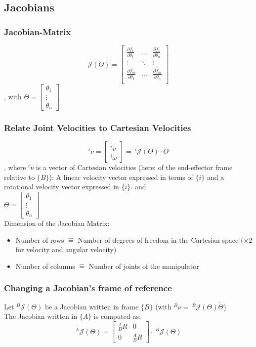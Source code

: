 \documentclass[10pt,a4paper]{article}
\newcommand{\vect}[1]{\ensuremath{\begin{bmatrix}#1\end{bmatrix}}}
\begin{document}
\subsection{Jacobians}
\subsubsection{Jacobian-Matrix}
$$
	\mathcal{J}(\Theta) = \begin{bmatrix}
		\frac{\partial f_1}{\partial \theta_1} & \dots & \frac{\partial f_1}{\partial \theta_n} \\
		\vdots & \ddots & \vdots \\
		\frac{\partial f_m}{\partial \theta_1} & \dots & \frac{\partial f_m}{\partial \theta_n} \\
	\end{bmatrix}
$$
, with $\Theta = \vect{\theta_1 \\ \vdots \\ \theta_n}$

\subsubsection{Relate Joint Velocities to Cartesian Velocities}
$$
	^i\nu = \vect{^iv \\ ^i\omega} = ~^i\mathcal{J}(\Theta) ⋅ \dot{\Theta}
$$
, where $^i\nu$ is a vector of Cartesian velocities (here: of the end-effector frame relative to $\{B\}$): A linear velocity vector expressed in terms of $\{i\}$ and a rotational velocity vector expressed in $\{i\}$. and \\
$\Theta = \vect{\theta_1 \\ \vdots \\ \theta_n}$ \\

Dimension of the Jacobian Matrix:
\begin{itemize}
	\item Number of rows $\hat{=}$ Number of degrees of freedom in the Cartesian space ($\times 2$ for velocity and angular velocity)
	\item Number of columns $\hat{=}$ Number of joints of the manipulator
\end{itemize}

\subsubsection{Changing a Jacobian's frame of reference}
Let $^B\mathcal{J}(\Theta)$ be a Jacobian written in frame $\{B\}$ (with $^B\nu  = ~^B\mathcal{J}(\Theta)\dot \Theta$)\\
The Jacobian written in $\{A\}$ is computed as: \\
$$
	^A\mathcal{J}(\Theta) = \left[\begin{array}{c|c}
		^A_BR & 0 \\
		\hline
		0 & ^A_BR
	\end{array}\right] ⋅ ~^B\mathcal{J}(\Theta)
$$
\end{document}
